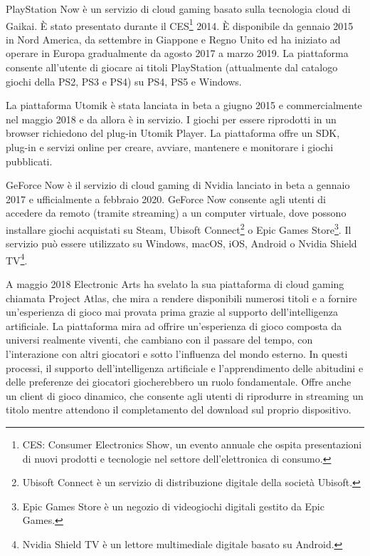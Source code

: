 PlayStation Now è un servizio di cloud gaming basato sulla tecnologia cloud di Gaikai. È stato presentato durante il CES\footnote{CES: Consumer Electronics Show, un evento annuale che ospita presentazioni di nuovi prodotti e tecnologie nel settore dell'elettronica di consumo.} 2014. È disponibile da gennaio 2015 in Nord America, da settembre in Giappone e Regno Unito ed ha iniziato ad operare in Europa gradualmente da agosto 2017 a marzo 2019. La piattaforma consente all'utente di giocare ai titoli PlayStation (attualmente dal catalogo giochi della PS2, PS3 e PS4) su PS4, PS5 e Windows\cite{PlayStation_Now}.

La piattaforma Utomik è stata lanciata in beta a giugno 2015 e commercialmente nel maggio 2018 e da allora è in servizio. I giochi per essere riprodotti in un browser richiedono del plug-in Utomik Player. La piattaforma offre un SDK, plug-in e servizi online per creare, avviare, mantenere e monitorare i giochi pubblicati\cite{Utomik}.

GeForce Now è il servizio di cloud gaming di Nvidia lanciato in beta a gennaio 2017 e ufficialmente a febbraio 2020. GeForce Now consente agli utenti di accedere da remoto (tramite streaming) a un computer virtuale, dove possono installare giochi acquistati su Steam, Ubisoft Connect\footnote{Ubisoft Connect è un servizio di distribuzione digitale della società Ubisoft.} o Epic Games Store\footnote{Epic Games Store è un negozio di videogiochi digitali gestito da Epic Games.}. Il servizio può essere utilizzato su Windows, macOS, iOS, Android o Nvidia Shield TV\footnote{Nvidia Shield TV è un lettore multimediale digitale basato su Android.}\cite{GeForce_Now}.

A maggio 2018 Electronic Arts ha svelato la sua piattaforma di cloud gaming chiamata Project Atlas, che mira a rendere disponibili numerosi titoli e a fornire un'esperienza di gioco mai provata prima grazie al supporto dell'intelligenza artificiale. La piattaforma mira ad offrire un'esperienza di gioco composta da universi realmente viventi, che cambiano con il passare del tempo, con l'interazione con altri giocatori e sotto l'influenza del mondo esterno. In questi processi, il supporto dell'intelligenza artificiale e l'apprendimento delle abitudini e delle preferenze dei giocatori giocherebbero un ruolo fondamentale. Offre anche un client di gioco dinamico, che consente agli utenti di riprodurre in streaming un titolo mentre attendono il completamento del download sul proprio dispositivo\cite{Project_Atlas}.

